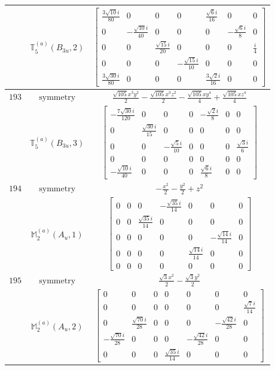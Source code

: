 \documentclass[fleqn,8pt,landscape]{jsarticle}
\begin{document}
\begin{longtable}{ccc}
$  $ & $ \mathbb{T}_{5}^{(a)}(B_{3u},2) $ & $ \begin{bmatrix} \frac{3 \sqrt{10} i}{80} & 0 & 0 & 0 & \frac{\sqrt{6} i}{16} & 0 & 0 \\ 0 & - \frac{\sqrt{10} i}{40} & 0 & 0 & 0 & - \frac{\sqrt{6} i}{8} & 0 \\ 0 & 0 & \frac{\sqrt{15} i}{20} & 0 & 0 & 0 & \frac{i}{4} \\ 0 & 0 & 0 & - \frac{\sqrt{15} i}{10} & 0 & 0 & 0 \\ \frac{3 \sqrt{30} i}{80} & 0 & 0 & 0 & \frac{3 \sqrt{2} i}{16} & 0 & 0 \end{bmatrix} $ \\ \hline
$ 193 $ & $ \text{symmetry} $ & $ \frac{\sqrt{105} x^{3} y^{2}}{2} - \frac{\sqrt{105} x^{3} z^{2}}{2} - \frac{\sqrt{105} x y^{4}}{4} + \frac{\sqrt{105} x z^{4}}{4} $ \\
$  $ & $ \mathbb{T}_{5}^{(a)}(B_{3u},3) $ & $ \begin{bmatrix} - \frac{7 \sqrt{30} i}{120} & 0 & 0 & 0 & - \frac{\sqrt{2} i}{8} & 0 & 0 \\ 0 & \frac{\sqrt{30} i}{15} & 0 & 0 & 0 & 0 & 0 \\ 0 & 0 & - \frac{\sqrt{5} i}{10} & 0 & 0 & 0 & \frac{\sqrt{3} i}{6} \\ 0 & 0 & 0 & 0 & 0 & 0 & 0 \\ - \frac{\sqrt{10} i}{40} & 0 & 0 & 0 & \frac{\sqrt{6} i}{8} & 0 & 0 \end{bmatrix} $ \\ \hline
$ 194 $ & $ \text{symmetry} $ & $ - \frac{x^{2}}{2} - \frac{y^{2}}{2} + z^{2} $ \\
$  $ & $ \mathbb{M}_{2}^{(a)}(A_{u},1) $ & $ \begin{bmatrix} 0 & 0 & 0 & - \frac{\sqrt{35} i}{14} & 0 & 0 & 0 \\ 0 & 0 & \frac{\sqrt{35} i}{14} & 0 & 0 & 0 & 0 \\ 0 & 0 & 0 & 0 & 0 & - \frac{\sqrt{14} i}{14} & 0 \\ 0 & 0 & 0 & 0 & \frac{\sqrt{14} i}{14} & 0 & 0 \\ 0 & 0 & 0 & 0 & 0 & 0 & 0 \end{bmatrix} $ \\ \hline
$ 195 $ & $ \text{symmetry} $ & $ \frac{\sqrt{3} x^{2}}{2} - \frac{\sqrt{3} y^{2}}{2} $ \\
$  $ & $ \mathbb{M}_{2}^{(a)}(A_{u},2) $ & $ \begin{bmatrix} 0 & 0 & 0 & 0 & 0 & 0 & 0 \\ 0 & 0 & 0 & 0 & 0 & 0 & \frac{\sqrt{7} i}{14} \\ 0 & \frac{\sqrt{70} i}{28} & 0 & 0 & 0 & - \frac{\sqrt{42} i}{28} & 0 \\ - \frac{\sqrt{70} i}{28} & 0 & 0 & 0 & - \frac{\sqrt{42} i}{28} & 0 & 0 \\ 0 & 0 & 0 & \frac{\sqrt{35} i}{14} & 0 & 0 & 0 \end{bmatrix} $ \\ \hline

\end{longtable}
\end{document}
